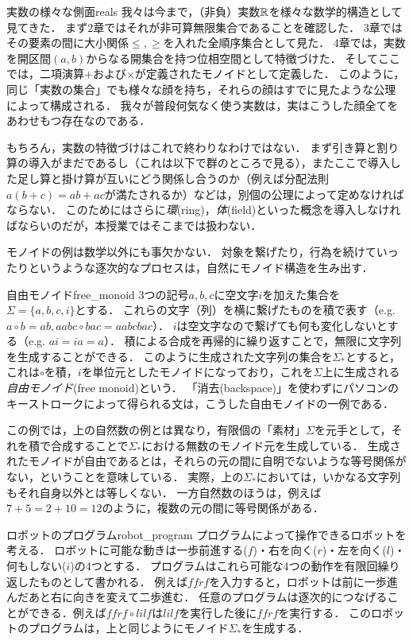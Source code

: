 \documentclass[11pt,a4paper, dvipdfmx]{jsarticle}
\begin{document}
\begin{hatten}{実数の様々な側面}{reals}
我々は今まで，（非負）実数$\mathbb{R}$を様々な数学的構造として見てきた．
まず2章ではそれが非可算無限集合であることを確認した．
3章ではその要素の間に大小関係$\leq, \geq$を入れた全順序集合として見た．
4章では，実数を開区間$(a,b)$からなる開集合を持つ位相空間として特徴づけた．
そしてここでは，二項演算$+$および$\times$が定義されたモノイドとして定義した．
このように，同じ「実数の集合」でも様々な顔を持ち，それらの顔はすでに見たような公理によって構成される．
我々が普段何気なく使う実数は，実はこうした顔全てをあわせもつ存在なのである．

 もちろん，実数の特徴づけはこれで終わりなわけではない．
 まず引き算と割り算の導入がまだであるし（これは以下で群のところで見る），またここで導入した足し算と掛け算が互いにどう関係し合うのか（例えば分配法則$a(b+c) = ab + ac$が満たされるか）などは，別個の公理によって定めなければならない．
 このためにはさらに\emph{環}(ring)，\emph{体}(field)といった概念を導入しなければならいのだが，本授業ではそこまでは扱わない．
\end{hatten}

モノイドの例は数学以外にも事欠かない．
対象を繋げたり，行為を続けていったりというような逐次的なプロセスは，自然にモノイド構造を生み出す．

\begin{rei}{自由モノイド}{free_monoid}
3つの記号$a, b, c$に空文字$i$を加えた集合を$\Sigma = \{a, b, c, i \}$とする．
これらの文字（列）を横に繋げたものを積で表す（e.g. $a \circ b = ab, aabc \circ bac = aabcbac$）．
$i$は空文字なので繋げても何も変化しないとする（e.g. $ai = ia = a$）．
積による合成を再帰的に繰り返すことで，無限に文字列を生成することができる．
このように生成された文字列の集合を$\Sigma_*$とすると，これは$\circ$を積，$i$を単位元としたモノイドになっており，これを$\Sigma$上に生成される\emph{自由モノイド}(free monoid)という．
「消去(backspace)」を使わずにパソコンのキーストロークによって得られる文は，こうした自由モノイドの一例である．
\end{rei}

この例では，上の自然数の例とは異なり，有限個の「素材」$\Sigma$を元手として，それを積で合成することで$\Sigma_*$における無数のモノイド元を生成している．
生成されたモノイドが自由であるとは，それらの元の間に自明でないような等号関係がない，ということを意味している．
実際，上の$\Sigma_*$においては，いかなる文字列もそれ自身以外とは等しくない．
一方自然数のほうは，例えば$7 + 5 = 2 + 10 = 12$のように，複数の元の間に等号関係がある．


\begin{rei}{ロボットのプログラム}{robot_program}
プログラムによって操作できるロボットを考える．
ロボットに可能な動きは一歩前進する($f$)・右を向く($r$)・左を向く($l$)・何もしない($i$)の4つとする．
プログラムはこれら可能な4つの動作を有限回繰り返したものとして書かれる．
例えば$ffrf$を入力すると，ロボットは前に一歩進んだあと右に向きを変えて二歩進む．
任意のプログラムは逐次的につなげることができる．例えば$ffrf \circ lilf$は$lilf$を実行した後に$ffrf$を実行する．
このロボットのプログラムは，上と同じようにモノイド$\Sigma_*$を生成する．
\end{rei}
\end{document}
